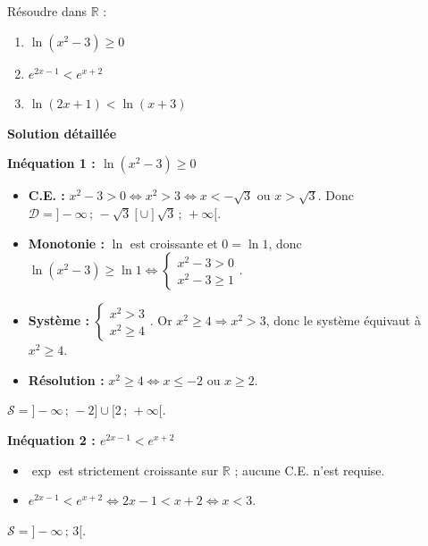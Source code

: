 \documentclass[11pt]{article}
\begin{document}
\begin{exoresolu}
Résoudre dans $\mathbb{R}$ :
\begin{enumerate}
    \item $\ln(x^2 - 3) \geqslant 0$
    \item $e^{2x-1} < e^{x+2}$
    \item $\ln(2x+1) < \ln(x+3)$
\end{enumerate}
\tcblower
\textbf{Solution détaillée}

\textbf{Inéquation 1 : $\ln(x^2 - 3) \geqslant 0$}
\begin{itemize}
    \item \textbf{C.E. :} $x^2 - 3 > 0 \iff x^2 > 3 \iff x < -\sqrt{3}$ ou $x > \sqrt{3}$. Donc $\mathcal{D} = ]-\infty\,;\,-\sqrt{3}[ \cup ]\sqrt{3}\,;\,+\infty[$.
    \item \textbf{Monotonie :} $\ln$ est croissante et $0=\ln 1$, donc $\ln(x^2-3) \geqslant \ln 1 \iff \begin{cases} x^2-3 > 0 \\ x^2-3 \geqslant 1 \end{cases}$.
    \item \textbf{Système :} $\begin{cases} x^2 > 3 \\ x^2 \geqslant 4 \end{cases}$. Or $x^2\geqslant 4 \Rightarrow x^2 > 3$, donc le système équivaut à $x^2 \geqslant 4$.
    \item \textbf{Résolution :} $x^2 \geqslant 4 \iff x \leqslant -2$ ou $x \geqslant 2$.
\end{itemize}
$\mathcal{S} = ]-\infty\,;\,-2] \cup [2\,;\,+\infty[$.

\textbf{Inéquation 2 : $e^{2x-1} < e^{x+2}$}
\begin{itemize}
    \item $\exp$ est strictement croissante sur $\mathbb{R}$ ; aucune C.E. n'est requise.
    \item $e^{2x-1} < e^{x+2} \iff 2x-1 < x+2 \iff x < 3$.
\end{itemize}
$\mathcal{S} = ]-\infty\,;\, 3[$.


\end{exoresolu}
\end{document}
